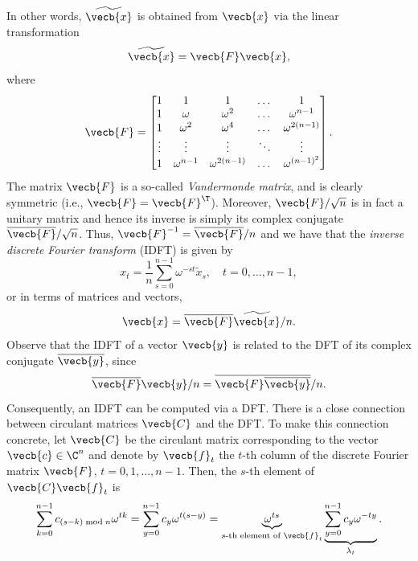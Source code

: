 In other words, $\widetilde{\vecb{x}}$ is obtained from $\vecb{x}$ via the linear transformation
\begin{equation*}
	\widetilde{\vecb{x}} = \vecb{F} \vecb{x},
\end{equation*}
where
\begin{equation*}
	\vecb{F} =
	\begin{bmatrix}
		1      & 1            & 1               & \dots  & 1                \\
		1      & \omega       & \omega^2        & \dots  & \omega^{n-1}     \\
		1      & \omega^2     & \omega^4        & \dots  & \omega^{2(n-1)}  \\
		\vdots & \vdots       & \vdots          & \ddots & \vdots           \\
		1      & \omega^{n-1} & \omega^{2(n-1)} & \dots  & \omega^{(n-1)^2}
	\end{bmatrix}.
\end{equation*}
The matrix $\vecb{F}$ is a so-called \textit{Vandermonde matrix}, and is clearly symmetric (i.e., $\vecb{F} = \vecb{F}^\T$). Moreover, $\vecb{F}/\sqrt{n}$ is in fact a unitary matrix and hence its inverse is simply its complex conjugate $\overline{\vecb{F}}/\sqrt{n}$. Thus, $\vecb{F}^{-1} = \overline{\vecb{F}}/n$ and we have that the \textit{inverse discrete Fourier transform} (IDFT) is given by
\begin{equation}
	x_t = \frac{1}{n} \sum_{s=0}^{n-1} \omega^{-st} \widetilde{x}_s, \quad t = 0, \dots, n-1, \label{eq:IDFTDefinition}
\end{equation}
or in terms of matrices and vectors,
\begin{equation*}
	\vecb{x} = \overline{\vecb{F}} \widetilde{\vecb{x}} / n.
\end{equation*}
Observe that the IDFT of a vector $\vecb{y}$ is related to the DFT of its complex conjugate $\overline{\vecb{y}}$, since
\begin{equation*}
	\overline{\vecb{F}} \vecb{y} / n = \overline{\vecb{F} \overline{\vecb{y}}} / n.
\end{equation*}
Consequently, an IDFT can be computed via a DFT.
There is a close connection between circulant matrices $\vecb{C}$ and the DFT. To make this connection concrete, let $\vecb{C}$ be the circulant matrix corresponding to the vector $\vecb{c} \in \C^n$ and denote by $\vecb{f}_t$ the $t$-th column of the discrete Fourier matrix $\vecb{F}$, $t=0, 1, \dots, n-1$. Then, the $s$-th element of $\vecb{C} \vecb{f}_t$ is
\begin{equation*}
	\sum_{k=0}^{n-1} c_{(s-k) \bmod n} \omega^{tk} = \sum_{y=0}^{n-1} c_y \omega^{t(s-y)} = \underbrace{\omega^{ts}}_{s\text{-th element of } \vecb{f}_t} \underbrace{\sum_{y=0}^{n-1} c_y \omega^{-ty}}_{\lambda_t}.
\end{equation*}
